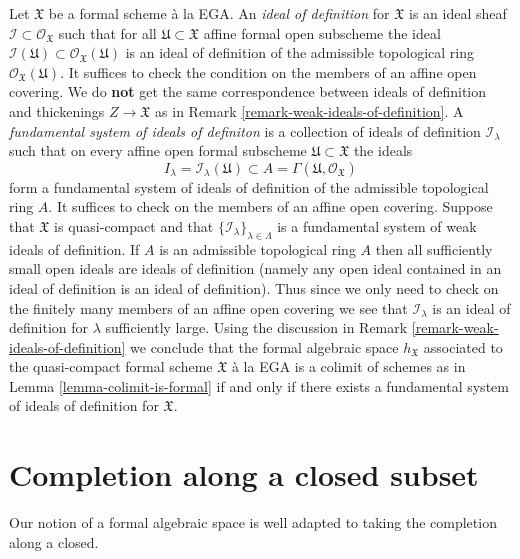 \begin{remark}
\label{remark-ideals-of-definition}
Let $\mathfrak X$ be a formal scheme \`a la EGA.
An {\it ideal of definition} for $\mathfrak X$ is an ideal sheaf
$\mathcal{I} \subset \mathcal{O}_\mathfrak X$ such that
for all $\mathfrak U \subset \mathfrak X$ affine formal open subscheme
the ideal
$\mathcal{I}(\mathfrak U) \subset \mathcal{O}_\mathfrak X(\mathfrak U)$
is an ideal of definition of the admissible topological ring
$\mathcal{O}_\mathfrak X(\mathfrak U)$.
It suffices to check the condition on the members of an affine open covering.
We do {\bf not} get the same correspondence between ideals of definition
and thickenings $Z \to \mathfrak X$ as in
Remark \ref{remark-weak-ideals-of-definition}.
A {\it fundamental system of ideals of definiton}
is a collection of ideals of definition
$\mathcal{I}_\lambda$ such that on every affine open
formal subscheme $\mathfrak U \subset \mathfrak X$ the
ideals
$$
I_\lambda = \mathcal{I}_\lambda(\mathfrak U) \subset
A = \Gamma(\mathfrak U, \mathcal{O}_\mathfrak X)
$$
form a fundamental system of ideals of definition of the
admissible topological ring $A$. It suffices to check
on the members of an affine open covering. Suppose that $\mathfrak X$
is quasi-compact and that $\{\mathcal{I}_\lambda\}_{\lambda \in \Lambda}$
is a fundamental system of weak ideals of definition.
If $A$ is an admissible topological ring $A$ then all
sufficiently small open ideals are ideals of definition
(namely any open ideal contained in an ideal of definition
is an ideal of definition). Thus since we only need to check
on the finitely many members of an affine open covering
we see that $\mathcal{I}_\lambda$ is an ideal of definition
for $\lambda$ sufficiently large. Using the discussion in
Remark \ref{remark-weak-ideals-of-definition} we conclude that
the formal algebraic space $h_\mathfrak X$ associated to
the quasi-compact formal scheme $\mathfrak X$ \`a la EGA
is a colimit of schemes as in Lemma \ref{lemma-colimit-is-formal}
if and only if there exists a fundamental system of ideals of definition
for $\mathfrak X$.
\end{remark}






\section{Completion along a closed subset}
\label{section-completion}

\noindent
Our notion of a formal algebraic space is well adapted to taking the
completion along a closed.

